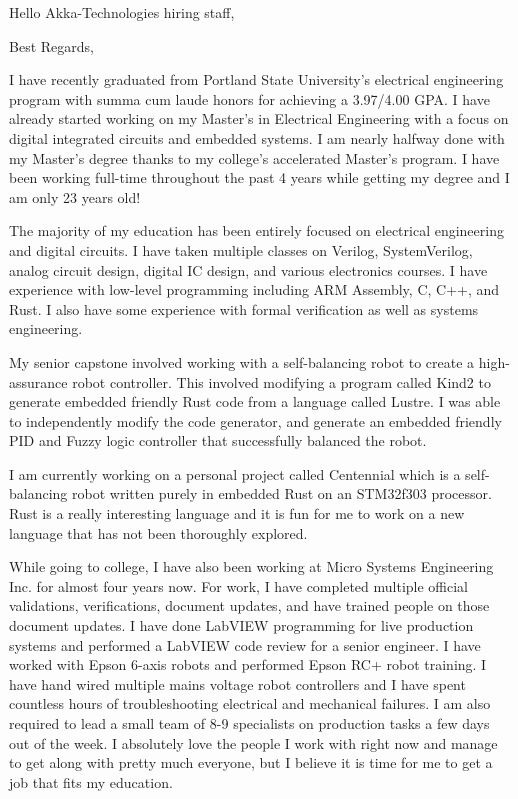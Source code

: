 \documentclass[letterpaper]{moderncv}        %
\begin{document}
    
\recipient{ }{ }
\date{\today}
\opening{Hello Akka-Technologies hiring staff,}
\closing{Best Regards,}
\makelettertitle

I have recently graduated from Portland State University's electrical engineering program with summa cum laude honors for achieving a 3.97/4.00 GPA.  I have already started working on my Master's in Electrical Engineering with a focus on digital integrated circuits and embedded systems.  I am nearly halfway done with my Master's degree thanks to my college's accelerated Master’s program.  I have been working full-time throughout the past 4 years while getting my degree and I am only 23 years old!

The majority of my education has been entirely focused on electrical engineering and digital circuits.  I have taken multiple classes on Verilog, SystemVerilog, analog circuit design, digital IC design, and various electronics courses.  I have experience with low-level programming including ARM Assembly, C, C++, and Rust.  I also have some experience with formal verification as well as systems engineering.

My senior capstone involved working with a self-balancing robot to create a high-assurance robot controller.  This involved modifying a program called Kind2 to generate embedded friendly Rust code from a language called Lustre.  I was able to independently modify the code generator, and generate an embedded friendly PID and Fuzzy logic controller that successfully balanced the robot.

I am currently working on a personal project called Centennial which is a self-balancing robot written purely in embedded Rust on an STM32f303 processor.  Rust is a really interesting language and it is fun for me to work on a new language that has not been thoroughly explored.

While going to college, I have also been working at Micro Systems Engineering Inc. for almost four years now.   For work, I have completed multiple official validations, verifications, document updates, and have trained people on those document updates.  I have done LabVIEW programming for live production systems and performed a LabVIEW code review for a senior engineer.  I have worked with Epson 6-axis robots and performed Epson RC+ robot training.  I have hand wired multiple mains voltage robot controllers and I have spent countless hours of troubleshooting electrical and mechanical failures.  I am also required to lead a small team of 8-9 specialists on production tasks a few days out of the week.  I absolutely love the people I work with right now and manage to get along with pretty much everyone, but I believe it is time for me to get a job that fits my education.

\makeletterclosing
\end{document}
